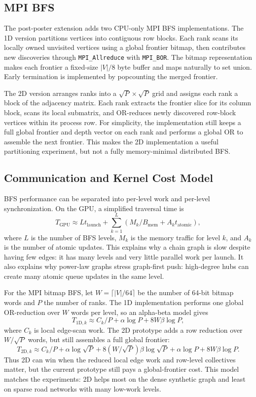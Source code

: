 \documentclass[11pt]{article}
\begin{document}
\subsection{MPI BFS}

The post-poster extension adds two CPU-only MPI BFS implementations. The 1D
version partitions vertices into contiguous row blocks. Each rank scans its
locally owned unvisited vertices using a global frontier bitmap, then contributes
new discoveries through \texttt{MPI\_Allreduce} with \texttt{MPI\_BOR}. The
bitmap representation makes each frontier a fixed-size $|V|/8$ byte buffer and
maps naturally to set union. Early termination is implemented by popcounting the
merged frontier.

The 2D version arranges ranks into a $\sqrt{P}\times\sqrt{P}$ grid and assigns
each rank a block of the adjacency matrix. Each rank extracts the frontier slice
for its column block, scans its local submatrix, and OR-reduces newly discovered
row-block vertices within its process row. For simplicity, the implementation
still keeps a full global frontier and depth vector on each rank and performs a
global OR to assemble the next frontier. This makes the 2D implementation a
useful partitioning experiment, but not a fully memory-minimal distributed BFS.

\subsection{Communication and Kernel Cost Model}

BFS performance can be separated into per-level work and per-level
synchronization. On the GPU, a simplified traversal time is
\[
    T_{\mathrm{GPU}} \approx L t_{\mathrm{launch}}
    + \sum_{k=1}^{L} (M_k / B_{\mathrm{mem}} + A_k t_{\mathrm{atomic}}),
\]
where $L$ is the number of BFS levels, $M_k$ is the memory traffic for level
$k$, and $A_k$ is the number of atomic updates. This explains why a chain graph
is slow despite having few edges: it has many levels and very little parallel
work per launch. It also explains why power-law graphs stress graph-first push:
high-degree hubs can create many atomic queue updates in the same level.

For the MPI bitmap BFS, let $W=\lceil |V|/64\rceil$ be the number of 64-bit
bitmap words and $P$ the number of ranks. The 1D implementation performs one
global OR-reduction over $W$ words per level, so an alpha-beta model gives
\[
    T_{\mathrm{1D},k} \approx C_k/P
    + \alpha \log P + 8 W \beta \log P ,
\]
where $C_k$ is local edge-scan work. The 2D prototype adds a row reduction over
$W/\sqrt{P}$ words, but still assembles a full global frontier:
\[
    T_{\mathrm{2D},k} \approx C_k/P
    + \alpha \log \sqrt{P} + 8(W/\sqrt{P})\beta \log \sqrt{P}
    + \alpha \log P + 8W\beta \log P .
\]
Thus 2D can win when the reduced local edge work and row-level collectives
matter, but the current prototype still pays a global-frontier cost. This model
matches the experiments: 2D helps most on the dense synthetic graph and least
on sparse road networks with many low-work levels.
\end{document}

